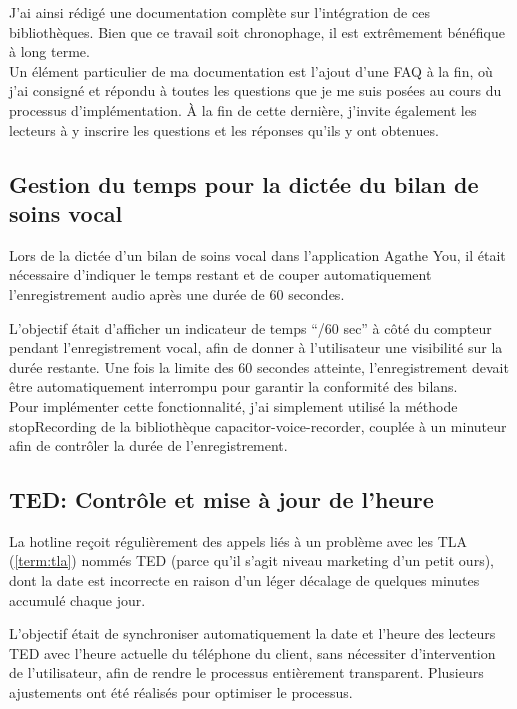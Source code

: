 \documentclass{article}
\begin{document}
J'ai ainsi rédigé une documentation complète sur l'intégration de ces bibliothèques. Bien que ce travail soit chronophage, il est extrêmement bénéfique à long terme. \\

Un élément particulier de ma documentation est l'ajout d'une FAQ à la fin, où j'ai consigné et répondu à toutes les questions que je me suis posées au cours du processus d'implémentation. À la fin de cette dernière, j'invite également les lecteurs à y inscrire les questions et les réponses qu'ils y ont obtenues.

\subsection{Gestion du temps pour la dictée du bilan de soins vocal}

Lors de la dictée d'un bilan de soins vocal dans l'application Agathe You, il était nécessaire d'indiquer le temps restant et de couper automatiquement l'enregistrement audio après une durée de 60 secondes.

L'objectif était d'afficher un indicateur de temps “/60 sec” à côté du compteur pendant l'enregistrement vocal, afin de donner à l'utilisateur une visibilité sur la durée restante. Une fois la limite des 60 secondes atteinte, l'enregistrement devait être automatiquement interrompu pour garantir la conformité des bilans. \\

Pour implémenter cette fonctionnalité, j'ai simplement utilisé la méthode stopRecording de la bibliothèque capacitor-voice-recorder, couplée à un minuteur afin de contrôler la durée de l'enregistrement.

\newpage

\subsection{TED: Contrôle et mise à jour de l'heure}

La hotline reçoit régulièrement des appels liés à un problème avec les TLA (\ref{term:tla}) nommés TED (parce qu'il s'agit niveau marketing d'un petit ours), dont la date est incorrecte en raison d'un léger décalage de quelques minutes accumulé chaque jour.

L'objectif était de synchroniser automatiquement la date et l'heure des lecteurs TED avec l'heure actuelle du téléphone du client, sans nécessiter d'intervention de l'utilisateur, afin de rendre le processus entièrement transparent. Plusieurs ajustements ont été réalisés pour optimiser le processus. \\
\end{document}
